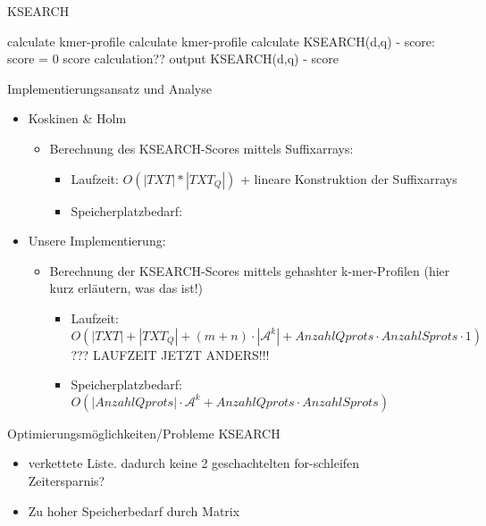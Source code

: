 \documentclass[aspectratio=1610]{beamer}
\begin{document}
\begin{frame}{KSEARCH}
 \begin{algorithmic}
        \State calculate kmer-profile
           \State calculate kmer-profile
           \State calculate KSEARCH(d,q) - score:
           \State score = 0
             \State score calculation??
           \EndFor
         \State output KSEARCH(d,q) - score
         \EndFor
      \EndFor     
    \EndFunction
  \end{algorithmic}
\end{frame}

\begin{frame}{Implementierungsansatz und Analyse}
  \begin{itemize}
    \item Koskinen \& Holm
      \begin{itemize}
        \item Berechnung des KSEARCH-Scores mittels Suffixarrays:
          \begin{itemize}
            \item Laufzeit: $O(|TXT|*|TXT_Q|)$ + lineare Konstruktion der Suffixarrays
            \item Speicherplatzbedarf:
          \end{itemize}
      \end{itemize}
    \item Unsere Implementierung:
      \begin{itemize}
        \item Berechnung der KSEARCH-Scores mittels gehashter k-mer-Profilen (hier kurz erläutern, was das ist!)
          \begin{itemize}
            \item Laufzeit: $O(|TXT|+|TXT_Q|+(m+n) \cdot |\mathcal A^k|+ Anzahl Qprots \cdot Anzahl Sprots \cdot 1)$ ??? LAUFZEIT JETZT ANDERS!!!
            \item Speicherplatzbedarf: $O(|Anzahl Qprots| \cdot \mathcal A^k + Anzahl Qprots \cdot Anzahl Sprots)$
          \end{itemize}
      \end{itemize}
  \end{itemize}
\end{frame}

\begin{frame}{Optimierungsmöglichkeiten/Probleme KSEARCH}
  \begin{itemize}
    \item verkettete Liste. dadurch keine 2 geschachtelten for-schleifen\\
          Zeitersparnis?
    \item Zu hoher Speicherbedarf durch Matrix
  \end{itemize}
\end{frame}
\end{document}

